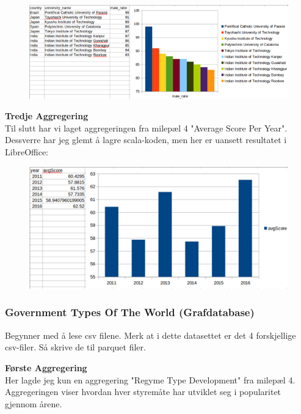 \FigureCounter
\begin{figure}[H]
    \includegraphics[width=\textwidth]{images/milepael5/resUniMaleRatio.png}
\end{figure}

\textbf{Tredje Aggregering}\\
Til slutt har vi laget aggregeringen fra milepæl 4 "Average Score Per Year". Dessverre har jeg glemt å lagre scala-koden, men her er uansett resultatet i LibreOffice:

\FigureCounter
\begin{figure}[H]
    \includegraphics[scale=1]{images/milepael5/avgScoreTotStudentsActual.png}
\end{figure}


\subsubsection{Government Types Of The World (Grafdatabase)}
Begynner med å lese csv filene. Merk at i dette datasettet er det 4 forskjellige csv-filer. Så skrive de til parquet filer.


\textbf{Første Aggregering}\\
Her lagde jeg kun en aggregering "Regyme Type Development" fra milepæl 4. Aggregeringen viser hvordan hver styremåte har utviklet seg i popularitet gjennom årene.

